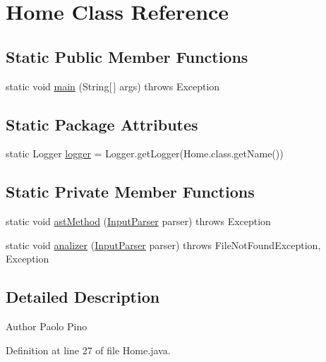 \hypertarget{class_home}{\section{Home Class Reference}
\label{class_home}
}
\subsection*{Static Public Member Functions}
\begin{DoxyCompactItemize}
\item 
static void \hyperlink{class_home_a824a2d585cb36f1a452ebc5db9b49ed0}{main} (String\mbox{[}$\,$\mbox{]} args)  throws Exception
\end{DoxyCompactItemize}
\subsection*{Static Package Attributes}
\begin{DoxyCompactItemize}
\item 
static Logger \hyperlink{class_home_ac74d97ae59ddf53153a62e8790619756}{logger} = Logger.\-get\-Logger(Home.\-class.\-get\-Name())
\end{DoxyCompactItemize}
\subsection*{Static Private Member Functions}
\begin{DoxyCompactItemize}
\item 
static void \hyperlink{class_home_a6ecba75c6ecc1abdd9c75352d34a7df7}{ast\-Method} (\hyperlink{classinput_parser_1_1_input_parser}{Input\-Parser} parser)  throws Exception 
\item 
static void \hyperlink{class_home_a33f6f6a95fbaf56e713df2a9ec52f5b3}{analizer} (\hyperlink{classinput_parser_1_1_input_parser}{Input\-Parser} parser)  throws File\-Not\-Found\-Exception, Exception 
\end{DoxyCompactItemize}


\subsection{Detailed Description}
\begin{DoxyAuthor}{Author}
Paolo Pino 
\end{DoxyAuthor}


Definition at line 27 of file Home.\-java.



